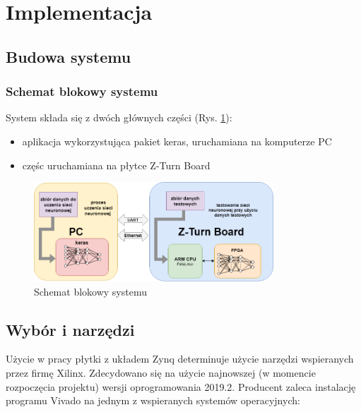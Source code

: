 \newpage %
\cleardoublepage %
\pagestyle{headings}

\section{Implementacja}

\subsection{Budowa systemu}

\subsubsection{Schemat blokowy systemu}

System składa się z dwóch głównych części (Rys. \ref{schemat_blokowy}):
\begin{itemize}
  \item aplikacja wykorzystująca pakiet keras, uruchamiana na komputerze PC
  \item częśc uruchamiana na płytce Z-Turn Board
\end{itemize}

\begin{figure}[h]
  \centering
  \includegraphics[width=0.8\textwidth]{img/schemat_blokowy.png}
  \caption{Schemat blokowy systemu}
  \label{schemat_blokowy}
\end{figure}

\subsection{Wybór i narzędzi}

Użycie w pracy płytki z układem Zynq determinuje użycie narzędzi wspieranych 
przez firmę Xilinx. Zdecydowano się na użycie najnowszej (w momencie rozpoczęcia 
projektu) wersji oprogramowania 2019.2. Producent zaleca\cite{VivadoGuide} instalację 
programu Vivado na jednym z wspieranych systemów operacyjnych:

